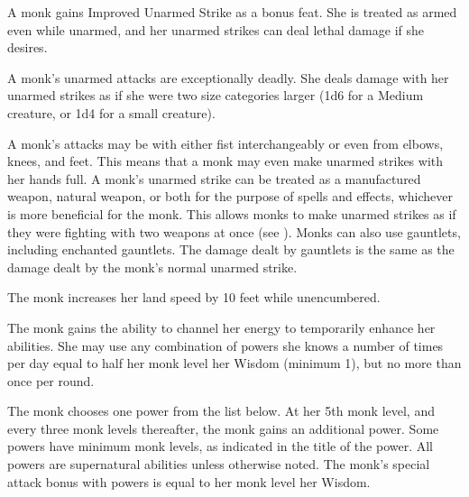  A monk gains Improved Unarmed Strike as a bonus feat. She is treated as armed even while unarmed, and her unarmed strikes can deal lethal damage if she desires.

 A monk's unarmed attacks are exceptionally deadly. She deals damage with her unarmed strikes as if she were two size categories larger (1d6 for a Medium creature, or 1d4 for a small creature).

A monk's attacks may be with either fist interchangeably or even from elbows, knees, and feet. This means that a monk may even make unarmed strikes with her hands full. A monk's unarmed strike can be treated as a manufactured weapon, natural weapon, or both for the purpose of spells and effects, whichever is more beneficial for the monk. This allows monks to make unarmed strikes as if they were fighting with two weapons at once (see ). Monks can also use gauntlets, including enchanted gauntlets. The damage dealt by gauntlets is the same as the damage dealt by the monk's normal unarmed strike.

 The monk increases her land speed by 10 feet while unencumbered.

 The monk gains the ability to channel her \ki energy to temporarily enhance her abilities. She may use any combination of \ki powers she knows a number of times per day equal to half her monk level \add her Wisdom (minimum 1), but no more than once per round.

The monk chooses one \ki power from the list below. At her 5th monk level, and every three monk levels thereafter, the monk gains an additional \ki power. Some \ki powers have minimum monk levels, as indicated in the title of the power. All \ki powers are supernatural abilities unless otherwise noted. The monk's special attack bonus with \ki powers is equal to her monk level \add her Wisdom.

